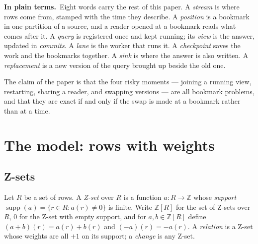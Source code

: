 \documentclass[11pt,a4paper]{article}
\renewcommand{\_}{\oldunderscore\allowbreak}
\newcommand{\Z}{\mathbb{Z}}
\newcommand{\ZS}[1]{\Z[#1]}
\newcommand{\supp}{\operatorname{supp}}
\newcommand{\defn}[1]{\emph{#1}}
\newcommand{\pt}{\textbf{In plain terms.}\ }
\begin{document}
\begin{plain}
\pt Eight words carry the rest of this paper. A \emph{stream} is where rows come from, stamped with
the time they describe. A \emph{position} is a bookmark in one partition of a source, and a reader
opened at a bookmark reads what comes after it. A \emph{query} is registered once and kept running;
its \emph{view} is the answer, updated in \emph{commits}. A \emph{lane} is the worker that runs it. A
\emph{checkpoint} saves the work and the bookmarks together. A \emph{sink} is where the answer is
also written. A \emph{replacement} is a new version of the query brought up beside the old one.

The claim of the paper is that the four risky moments --- joining a running view, restarting, sharing
a reader, and swapping versions --- are all bookmark problems, and that they are exact if and only if
the swap is made at a bookmark rather than at a time.
\end{plain}

\section{The model: rows with weights}\label{sec:model}

\subsection{Z-sets}

\begin{definition}[Z-set]\label{def:zset}
Let $R$ be a set of rows. A \defn{Z-set} over $R$ is a function $a \colon R \to \Z$ whose
\defn{support} $\supp(a) = \{ r \in R : a(r) \neq 0 \}$ is finite. Write $\ZS{R}$ for the set of
Z-sets over $R$, $0$ for the Z-set with empty support, and for $a, b \in \ZS{R}$ define
$(a+b)(r) = a(r) + b(r)$ and $(-a)(r) = -a(r)$. A \defn{relation} is a Z-set whose weights are all
$+1$ on its support; a \defn{change} is any Z-set.
\end{definition}
\end{document}
